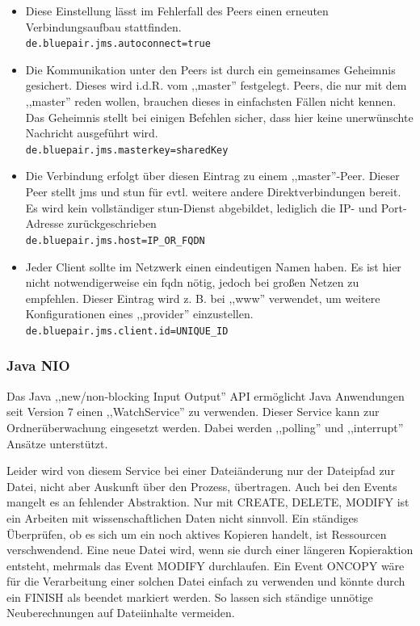 \documentclass[oneside, ngerman, toc=bibliography,bibliography=totoc,listof=entryprefix, open=right,numbers=noenddot,fontsize=12pt]{scrbook}
\begin{document}
\begin{itemize}
    \item
    Diese Einstellung lässt im Fehlerfall des Peers einen erneuten Verbindungsaufbau stattfinden.\\
    \verb|de.bluepair.jms.autoconnect=true|
    
    \item Die Kommunikation unter den Peers ist durch ein gemeinsames Geheimnis gesichert. Dieses wird i.d.R. vom ,,master'' festgelegt. Peers, die nur mit dem ,,master'' reden wollen, brauchen dieses in einfachsten Fällen nicht kennen. Das Geheimnis stellt bei einigen Befehlen sicher, dass hier keine unerwünschte Nachricht ausgeführt wird.\\  
    \verb|de.bluepair.jms.masterkey=sharedKey|
    
    \item Die Verbindung erfolgt über diesen Eintrag zu einem ,,master''-Peer.
    Dieser Peer stellt \acrshort{jms} und \acrshort{stun} für evtl. weitere andere Direktverbindungen bereit. Es wird kein vollständiger \acrshort{stun}-Dienst abgebildet, lediglich die IP- und Port-Adresse zurückgeschrieben\\
    \verb|de.bluepair.jms.host=IP_OR_FQDN|
    \item Jeder Client sollte im Netzwerk einen eindeutigen Namen haben. Es ist hier nicht notwendigerweise ein \acrshort{fqdn} nötig, jedoch bei großen Netzen zu empfehlen. Dieser Eintrag wird z. B. bei ,,www'' verwendet, um weitere Konfigurationen eines ,,provider'' einzustellen.\\
  \verb|de.bluepair.jms.client.id=UNIQUE_ID|
\end{itemize}


\subsubsection{Java NIO}
Das Java ,,new/non-blocking Input Output'' API ermöglicht Java Anwendungen seit Version 7 einen ,,WatchService'' zu verwenden. Dieser Service kann zur Ordnerüberwachung eingesetzt werden. Dabei werden ,,polling'' und ,,interrupt'' Ansätze unterstützt.

Leider wird von diesem Service bei einer Dateiänderung nur der Dateipfad zur Datei, nicht aber Auskunft über den Prozess, übertragen. Auch bei den Events mangelt es an fehlender Abstraktion. Nur mit CREATE, DELETE, MODIFY ist ein Arbeiten mit wissenschaftlichen Daten nicht sinnvoll. Ein ständiges Überprüfen, ob es sich um ein noch aktives Kopieren handelt, ist Ressourcen verschwendend. Eine neue Datei wird, wenn sie durch einer längeren Kopieraktion entsteht, mehrmals das Event MODIFY durchlaufen. Ein Event ONCOPY wäre für die Verarbeitung einer solchen Datei einfach zu verwenden und könnte durch ein FINISH als beendet markiert werden. So lassen sich ständige unnötige Neuberechnungen auf Dateiinhalte vermeiden.
\end{document}
